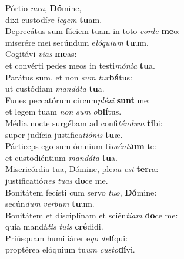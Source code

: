 \oddverse Pórtio \textit{me}\textit{a}, \textbf{Dó}mine,~\*\\
\oddverse dixi custodí\textit{re} \textit{le}\textit{gem} \textbf{tu}am.\\
\evenverse Deprecátus sum fáciem tuam in toto \textit{cor}\textit{de} \textbf{me}o:~\*\\
\evenverse miserére mei secúndum e\textit{ló}\textit{qui}\textit{um} \textbf{tu}um.\\
\oddverse Cogitávi \textit{vi}\textit{as} \textbf{me}as:~\*\\
\oddverse et convérti pedes meos in testi\textit{mó}\textit{ni}\textit{a} \textbf{tu}a.\\
\evenverse Parátus sum, et non \textit{sum} \textit{tur}\textbf{bá}tus:~\*\\
\evenverse ut custódiam \textit{man}\textit{dá}\textit{ta} \textbf{tu}a.\\
\oddverse Funes peccatórum circum\textit{plé}\textit{xi} \textbf{sunt} me:~\*\\
\oddverse et legem tuam \textit{non} \textit{sum} \textit{o}\textbf{blí}tus.\\
\evenverse Média nocte surgébam ad confi\textit{tén}\textit{dum} \textbf{ti}bi:~\*\\
\evenverse super judícia justifica\textit{ti}\textit{ó}\textit{nis} \textbf{tu}æ.\\
\oddverse Párticeps ego sum ómnium ti\textit{mén}\textit{ti}\textbf{um} te:~\*\\
\oddverse et custodiéntium \textit{man}\textit{dá}\textit{ta} \textbf{tu}a.\\
\evenverse Misericórdia tua, Dómine, ple\textit{na} \textit{est} \textbf{ter}ra:~\*\\
\evenverse justificatió\textit{nes} \textit{tu}\textit{as} \textbf{do}ce me.\\
\oddverse Bonitátem fecísti cum servo \textit{tu}\textit{o}, \textbf{Dó}mine:~\*\\
\oddverse secún\textit{dum} \textit{ver}\textit{bum} \textbf{tu}um.\\
\evenverse Bonitátem et disciplínam et scién\textit{ti}\textit{am} \textbf{do}ce me:~\*\\
\evenverse quia mandá\textit{tis} \textit{tu}\textit{is} \textbf{cré}didi.\\
\oddverse Priúsquam humiliárer e\textit{go} \textit{de}\textbf{lí}qui:~\*\\
\oddverse proptérea elóquium tu\textit{um} \textit{cu}\textit{sto}\textbf{dí}vi.\\

